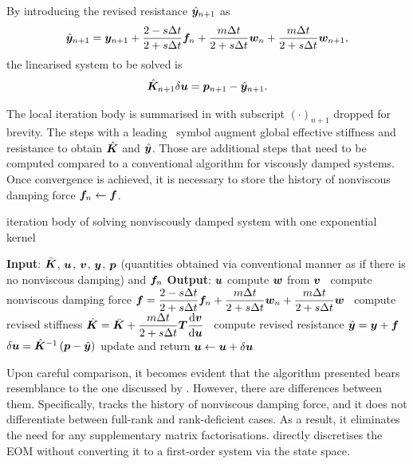 By introducing the revised resistance $\hat{\bm{y}}_{n+1}$ as
\begin{gather}\label{eq:revised_y}
\hat{\bm{y}}_{n+1}=\bm{y}_{n+1}+\dfrac{2-s\Delta{}t}{2+s\Delta{}t}\bm{f}_n+\dfrac{m\Delta{}t}{2+s\Delta{}t}\bm{w}_n+\dfrac{m\Delta{}t}{2+s\Delta{}t}\bm{w}_{n+1},
\end{gather}
the linearised system to be solved is
\begin{gather}\label{eq:revised_system}
\hat{\bm{K}}_{n+1}\delta\bm{u}=\bm{p}_{n+1}-\hat{\bm{y}}_{n+1}.
\end{gather}

The local iteration body is summarised in  with subscript $\left(\cdot\right)_{n+1}$ dropped for brevity.
The steps with a leading \faMicrochip~symbol augment global effective stiffness and resistance to obtain $\hat{\bm{K}}$ and $\hat{\bm{y}}$. Those are additional steps that need to be computed compared to a conventional algorithm for viscously damped systems. Once convergence is achieved, it is necessary to store the history of nonviscous damping force $\bm{f}_n\leftarrow\bm{f}$.
\begin{breakablealgorithm}
\caption{iteration body of solving nonviscously damped system with one exponential kernel}\label{algo:single_model}
\begin{algorithmic}
\State \textbf{Input}: $\bar{\bm{K}}$, $\bm{u}$, $\bm{v}$, $\bm{y}$, $\bm{p}$ (quantities obtained via conventional manner as if there is no nonviscous damping) and $\bm{f}_n$
\State \textbf{Output}: $\bm{u}$
\State compute $\bm{w}$ from $\bm{v}$
\State \faMicrochip~compute nonviscous damping force $\bm{f}=\dfrac{2-s\Delta{}t}{2+s\Delta{}t}\bm{f}_n+\dfrac{m\Delta{}t}{2+s\Delta{}t}\bm{w}_n+\dfrac{m\Delta{}t}{2+s\Delta{}t}\bm{w}$
\State \faMicrochip~compute revised stiffness $\hat{\bm{K}}=\bar{\bm{K}}+\dfrac{m\Delta{}t}{2+s\Delta{}t}\bm{T}\dfrac{\mathrm{d}\bm{v}}{\mathrm{d}\bm{u}}$
\State \faMicrochip~compute revised resistance $\hat{\bm{y}}=\bm{y}+\bm{f}$
\State $\delta\bm{u}=\hat{\bm{K}}^{-1}\left(\bm{p}-\hat{\bm{y}}\right)$
\State update and return $\bm{u}\leftarrow\bm{u}+\delta\bm{u}$
\end{algorithmic}
\end{breakablealgorithm}

Upon careful comparison, it becomes evident that the algorithm presented bears resemblance to the one discussed by \citet{Adhikari2004}. However, there are differences between them. Specifically,  tracks the history of nonviscous damping force, and it does not differentiate between full-rank and rank-deficient cases. As a result, it eliminates the need for any supplementary matrix factorisations.  directly discretises the EOM without converting it to a first-order system via the state space.

